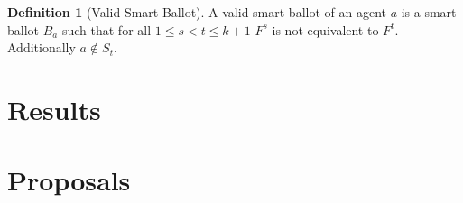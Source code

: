 \documentclass[11pt,a4paper, titlepage]{report}
\theoremstyle{definition}
\newtheorem{definition}[theorem]{Definition}
\begin{document}
\begin{definition}[Valid Smart Ballot]
    A valid smart ballot of an agent $a$ is a smart ballot $B_a$ such that for all $ 1 \leq s < t \leq k + 1$ $F^s$ is not equivalent to $F^t$. Additionally $a \notin S_t$.
\end{definition}

\chapter{Results}

\iffalse
Plan for this section:
1) Cast participation is achieved only for monotone functions. So, let's focus on monotone functions
2) Prove NP-hardness for MinMax, MinSum using only binary or and binary and.
3) Prove that no constant approximator to MinMax or MinSum exists.
4) Result on whether we are able to even determine whether a vote is achievable.
5) Generalise on why the proof works for all non-delegative, fair and monotone functions. 
\fi


\chapter{Proposals}
\end{document}
